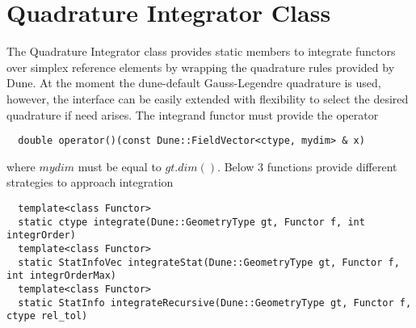 \section{Quadrature Integrator Class}
\label{interface-integrator-quadrature}

The Quadrature Integrator class provides static members to integrate functors over simplex reference elements by wrapping the quadrature rules provided by Dune. At the moment the dune-default Gauss-Legendre quadrature is used, however, the interface can be easily extended with flexibility to select the desired quadrature if need arises. The integrand functor must provide the operator \\

\begin{mybox}
\begin{lstlisting}
  double operator()(const Dune::FieldVector<ctype, mydim> & x)
\end{lstlisting}
\end{mybox}

\noindent
where $mydim$ must be equal to $gt.dim()$. Below 3 functions provide different strategies to approach integration \\

\begin{mybox}
\begin{lstlisting}
  template<class Functor>
  static ctype integrate(Dune::GeometryType gt, Functor f, int integrOrder)
  template<class Functor>
  static StatInfoVec integrateStat(Dune::GeometryType gt, Functor f, int integrOrderMax)
  template<class Functor>
  static StatInfo integrateRecursive(Dune::GeometryType gt, Functor f, ctype rel_tol)
\end{lstlisting}
\end{mybox}

